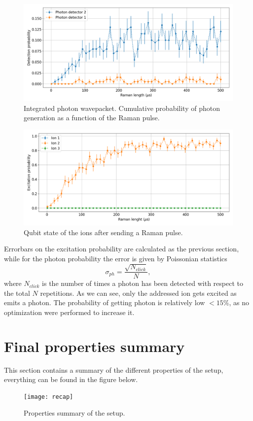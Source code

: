 \begin{figure}[H]
\centering
\includegraphics[width=\textwidth]{img/photonefficency_witherror}
\caption{Integrated photon wavepacket. Cumulative probability of photon generation as a function of the Raman pulse.}
\label{probphoton}
\end{figure}
\begin{figure}[H]
\centering
\includegraphics[width=\textwidth]{img/ramanlength_witherrors}
\caption{Qubit state of the ions after sending a Raman pulse.}
\label{probion}
\end{figure}
Errorbars on the excitation probability are calculated as the previous section, while for the photon probability the error is given by Poissonian statistics \cite{quantumoptics}
\begin{equation}
\sigma_{ph} = \frac{\sqrt{N_{click}}}{N},
\end{equation}
where $N_{click}$ is the number of times a photon has been detected with respect to the total $N$ repetitions.
As we can see, only the addressed ion gets excited as emits a photon. The probability of getting photon is relatively low $<15 \%$, as no optimization were performed to increase it.

\section{Final properties summary}
This section contains a summary of the different properties of the setup, everything can be found in the figure below.
\begin{figure}[H]
\centering
\texttt{[image: recap]}
\caption{Properties summary of the setup.}
\end{figure}
